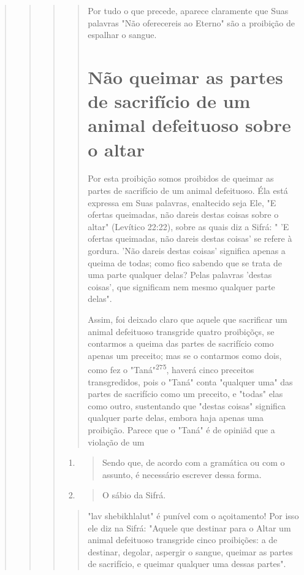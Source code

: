 \begin{quote}
\begin{quote}
\begin{quote}
\begin{quote}
Por tudo o que precede, aparece claramente que Suas palavras "Não
oferecereis ao Eterno" são a proibição de espalhar o sangue.

\section{Não queimar as partes de sacrifício de um animal defeituoso sobre o altar}

Por esta proibição somos proibidos de queimar as partes de sacrifí­cio
de um animal defeituoso. Éla está expressa em Suas palavras, enaltecido
se­ja Ele, "E ofertas queimadas, não dareis destas coisas sobre o altar"
(Levítico 22:22), sobre as quais diz a Sifrá: " 'E ofertas queimadas,
não dareis destas coi­sas' se refere à gordura. 'Não dareis destas
coisas' significa apenas a queima de todas; como fico sabendo que se
trata de uma parte qualquer delas? Pelas pala­vras 'destas coisas', que
significam nem mesmo qualquer parte delas".

Assim, foi deixado claro que aquele que sacrificar um animal defei­tuoso
transgride quatro proibiçõçs, se contarmos a queima das partes de
sacri­fício como apenas um preceito; mas se o contarmos como dois, como
fez o "Taná"\textsuperscript{275}, haverá cinco preceitos transgredidos,
pois o "Taná" conta "qual­quer uma" das partes de sacrifício como um
preceito, e "todas" elas como ou­tro, sustentando que "destas coisas"
significa qualquer parte delas, embora ha­ja apenas uma proibição.
Parece que o "Taná" é de opiniãd que a violação de um
\end{quote}

\begin{enumerate}
\def\labelenumi{\arabic{enumi}.}
\setcounter{enumi}{273}
\item
 \begin{quote}
 Sendo que, de acordo com a gramática ou com o assunto, é necessário
 escrever dessa forma.
 \end{quote}
\item
 \begin{quote}
 O sábio da Sifrá.
 \end{quote}
\end{enumerate}

\begin{quote}

"lav shebikhlalut" é punível com o açoitamento! Por isso ele diz na
Sifrá: "Aquele que destinar para o Altar um animal defeituoso transgride
cinco proibições: a de destinar, degolar, aspergir o sangue, queimar as
partes de sacrifício, e quei­mar qualquer uma dessas partes".


\end{quote}
\end{quote}
\end{quote}
\end{quote}
